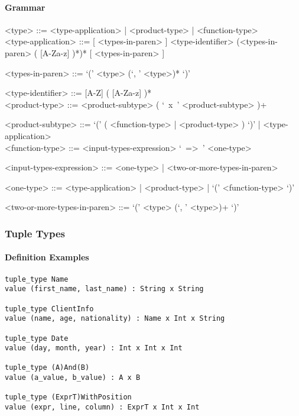\documentclass{article}
\begin{document}
\paragraph{Grammar}
\begin{grammar}
<type> ::= <type-application> | <product-type> | <function-type> \\

<type-application> ::=
[ <types-in-paren> ] <type-identifier> (<types-in-paren> ( [A-Za-z] )*)* [ <types-in-paren> ] 

<types-in-paren> ::= `(' <type> (`, ' <type>)* `)'

<type-identifier> ::= [A-Z] ( [A-Za-z] )* \\ 
 
<product-type> ::= <product-subtype> ( `\ x\ ' <product-subtype> )+

<product-subtype> ::=
`(' ( <function-type> | <product-type> ) `)' | <type-application> \\

<function-type> ::= <input-types-expression> `\ =>\ ' <one-type>

<input-types-expression> ::= <one-type> | <two-or-more-types-in-paren>

<one-type> ::= <type-application> | <product-type> | `(' <function-type> `)'

<two-or-more-types-in-paren> ::=  `(' <type> (`, ' <type>)+ `)'
\end{grammar}

\subsubsection{Tuple Types}
\label{subsubsec:tupts}

\paragraph{Definition Examples}

\begin{verbatim}
tuple_type Name
value (first_name, last_name) : String x String

tuple_type ClientInfo
value (name, age, nationality) : Name x Int x String

tuple_type Date
value (day, month, year) : Int x Int x Int

tuple_type (A)And(B)
value (a_value, b_value) : A x B

tuple_type (ExprT)WithPosition
value (expr, line, column) : ExprT x Int x Int
\end{verbatim}
\end{document}
